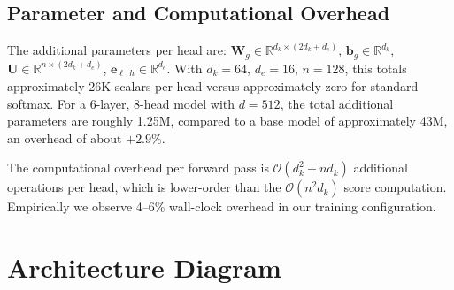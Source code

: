 \documentclass[11pt]{article}
\newcommand{\RR}{\mathbb{R}}
\newcommand{\bW}{\mathbf{W}}
\newcommand{\bU}{\mathbf{U}}
\newcommand{\be}{\mathbf{e}}
\newcommand{\bb}{\mathbf{b}}
\begin{document}
\subsection{Parameter and Computational Overhead}

The additional parameters per head are: $\bW_g \in \RR^{d_k \times (2d_k+d_e)}$, $\bb_g \in \RR^{d_k}$, $\bU \in \RR^{n \times (2d_k+d_e)}$, $\be_{\ell,h} \in \RR^{d_e}$. With $d_k=64$, $d_e=16$, $n=128$, this totals approximately 26K scalars per head versus approximately zero for standard softmax. For a 6-layer, 8-head model with $d=512$, the total additional parameters are roughly 1.25M, compared to a base model of approximately 43M, an overhead of about $+2.9\%$.

The computational overhead per forward pass is $\mathcal{O}(d_k^2 + nd_k)$ additional operations per head, which is lower-order than the $\mathcal{O}(n^2 d_k)$ score computation. Empirically we observe 4--6\% wall-clock overhead in our training configuration.

\section{Architecture Diagram}
\label{sec:arch}
\end{document}
